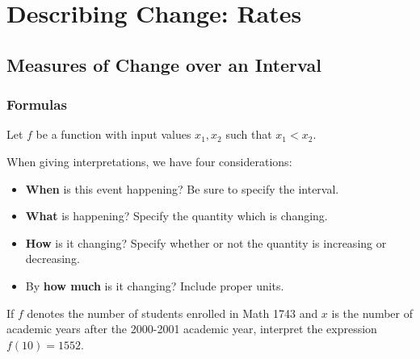 \documentclass[notes]{subfiles}
\begin{document}
	\chapter{Describing Change: Rates}
	\fancyhead[LO,RE]{\bfseries \currentname}
	\fancyfoot[C]{{}}
	\fancyfoot[RO,LE]{\large \thepage}	%


\section*{Measures of Change over an Interval}\label{cs21}
	\subsection*{Formulas}
		Let $f$ be a function with input values $x_1,x_2$ such that $x_1 < x_2$.
		\begin{crmk}[Change]
		\end{crmk}
		\begin{crmk}
		\end{crmk}
		\begin{crmk}
		\end{crmk}
			\newpage
			
		When giving interpretations, we have four considerations:
			\begin{itemize}
				\item \textbf{When} is this event happening?  Be sure to specify the interval.
				\item \textbf{What} is happening?  Specify the quantity which is changing.
				\item \textbf{How} is it changing?  Specify whether or not the quantity is increasing or decreasing.
				\item By \textbf{how much} is it changing?  Include proper units.
			\end{itemize}
		
		\begin{ex}
			If $f$ denotes the number of students enrolled in Math 1743 and $x$ is the number of academic years after the 2000-2001 academic year, interpret the expression $f(10) = 1552$.
		\end{ex}
			
\end{document}
